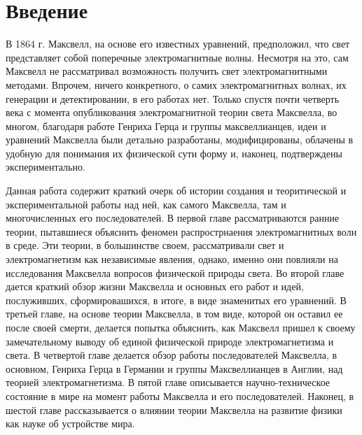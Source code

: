 \documentclass[12pt, oneside, a4paper]{article}
\begin{document}
\section*{Введение}
В 1864 г. Максвелл, на основе его известных уравнений, предположил, что свет представляет собой поперечные электромагнитные волны. Несмотря на это, сам Максвелл не рассматривал возможность получить свет электромагнитными методами. Впрочем, ничего конкретного, о самих электромагнитных волнах, их генерации и детектировании, в его работах нет. Только спустя почти четверть века с момента опубликования электромагнитной теории света Максвелла, во многом, благодаря работе Генриха Герца и группы максвеллианцев, идеи и уравнений Максвелла были детально разработаны, модифицированы, облачены в удобную для понимания их физической сути форму и, наконец, подтверждены экспериментально.

Данная работа содержит краткий очерк об истории создания и теоритической и экспериментальной работы над ней, как самого Максвелла, там и многочисленных его последователей. В первой главе рассматриваются ранние теории, пытавшиеся объяснить феномен распрострнаения электромагнитных волн в среде. Эти теории, в большинстве своем, рассматривали свет и электромагнетизм как независимые явления, однако, именно они повлияли на исследования Максвелла вопросов физической природы света. Во второй главе дается краткий обзор жизни Максвелла и основных его работ и идей, послуживших, сформировашихся, в итоге, в виде знаменитых его уравнений. В третьей главе, на основе теории Максвелла, в том виде, которой он оставил ее после своей смерти, делается попытка объяснить, как Максвелл пришел к своему замечательному выводу об единой физической природе электромагнетизма и света. В четвертой главе делается обзор работы последователей Максвелла, в основном, Генриха Герца в Германии и группы Максвеллианцев в Англии, над теорией электромагнетизма. В пятой главе описывается научно-техническое состояние в мире на момент работы Максвелла и его последователей. Наконец, в шестой главе рассказывается о влиянии теории Максвелла на развитие физики как науке об устройстве мира.
\end{document}
